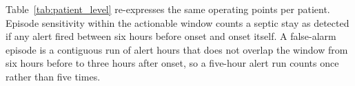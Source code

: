 Table~\ref{tab:patient_level} re-expresses the same operating points per
patient. Episode sensitivity within the actionable window counts a septic stay
as detected if any alert fired between six hours before onset and onset
itself. A false-alarm episode is a contiguous run of alert hours that does not
overlap the window from six hours before to three hours after onset, so a
five-hour alert run counts once rather than five times.

\begin{table}[H]
    \centering\small
\end{table}
